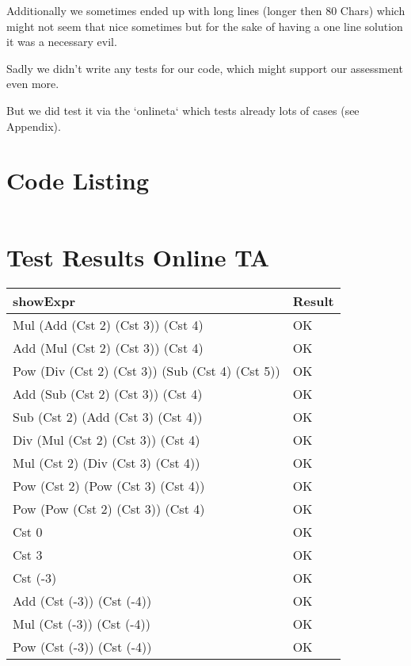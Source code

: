 \documentclass[12pt,a4paper]{article}
\begin{document}
Additionally we sometimes ended up with long lines (longer then 80 Chars) which might not seem that nice sometimes but for the sake of having a one line solution it was a necessary evil.

Sadly we didn't write any tests for our code, which might support our assessment even more.

But we did test it via the `onlineta` which tests already lots of cases (see Appendix).


\appendix
\section{Code Listing}

\inputminted{haskell}{src/Arithmetic.hs}

\section{Test Results Online TA}
\begin{tabularx}{\textwidth}[!htbp]{X|l}
 \textbf{showExpr} & Result \\
 \hline
   Mul (Add (Cst 2) (Cst 3)) (Cst 4) & OK \\
   \hline
    Add (Mul (Cst 2) (Cst 3)) (Cst 4) & OK \\
    Pow (Div (Cst 2) (Cst 3)) (Sub (Cst 4) (Cst 5)) & OK \\
    \hline
    Add (Sub (Cst 2) (Cst 3)) (Cst 4) & OK \\
    \hline
    Sub (Cst 2) (Add (Cst 3) (Cst 4)) & OK \\
    \hline
    Div (Mul (Cst 2) (Cst 3)) (Cst 4) & OK \\
    \hline
    Mul (Cst 2) (Div (Cst 3) (Cst 4)) & OK \\
    \hline
    Pow (Cst 2) (Pow (Cst 3) (Cst 4))& OK \\
    \hline
    Pow (Pow (Cst 2) (Cst 3)) (Cst 4)& OK \\
    \hline
    Cst 0 & OK \\
    \hline
    Cst 3 & OK \\
    \hline
    Cst (-3) & OK \\
    \hline
    Add (Cst (-3)) (Cst (-4)) & OK \\
    \hline
    Mul (Cst (-3)) (Cst (-4)) & OK \\
    \hline
    Pow (Cst (-3)) (Cst (-4)) & OK \\
     \hline
\end{tabularx}
\end{document}
